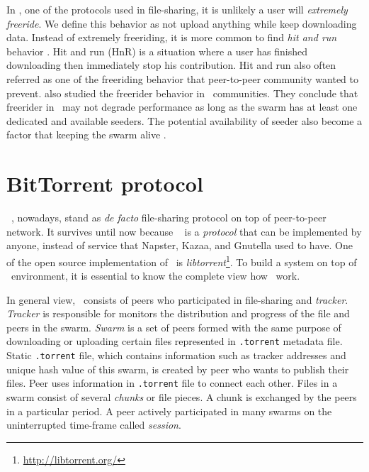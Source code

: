 In \bt, one of the protocols used in file-sharing, it is unlikely a user will \textit{extremely freeride}. We define this behavior as not upload anything while keep downloading data. Instead of extremely freeriding, it is more common to find \textit{hit and run} behavior \cite{2011:managesupplydemand:meulpolder}. Hit and run (HnR) is a situation where a user has finished downloading then immediately stop his contribution. Hit and run also often referred as one of the freeriding behavior that peer-to-peer community wanted to prevent. \citeauthor{2015:freeriderinbtcommunity:das} also studied the freerider behavior in \bt~communities. They conclude that freerider in \bt~may not degrade performance as long as the swarm has at least one dedicated and available seeders. The potential availability of seeder also become a factor that keeping the swarm alive \cite{2015:freeriderinbtcommunity:das}. 

\section{BitTorrent protocol}
\bt~\cite{2003:bittorrent:cohen}, nowadays, stand as \textit{de facto} file-sharing protocol on top of peer-to-peer network. It survives until now because \bt~ is a \textit{protocol} that can be implemented by anyone, instead of service that Napster, Kazaa, and Gnutella used to have. One of the open source implementation of \bt~is \textit{libtorrent}\footnote{\url{http://libtorrent.org/}}. To build a system on top of \bt~environment, it is essential to know the complete view how \bt~work. 

In general view, \bt~consists of peers who participated in file-sharing and \textit{tracker}. \textit{Tracker} is responsible for monitors the distribution and progress of the file and peers in the swarm. \textit{Swarm} is a set of peers formed with the same purpose of downloading or uploading certain files represented in \texttt{.torrent} metadata file. Static \texttt{.torrent} file, which contains information such as tracker addresses and unique hash value of this swarm, is created by peer who wants to publish their files. Peer uses information in \texttt{.torrent} file to connect each other. Files in a swarm consist of several \textit{chunks} or file pieces. A chunk is exchanged by the peers in a particular period. A peer actively participated in many swarms on the uninterrupted time-frame called \textit{session}.

